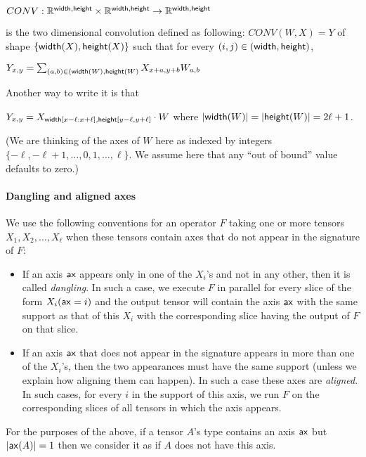 \documentclass{article}
\begin{document}
$CONV: \mathbb{R}^{\mathsf{width},\mathsf{height}} \times \mathbb{R}^{\mathsf{width},\mathsf{height}} \rightarrow \mathbb{R}^{\mathsf{width},\mathsf{height}}$

is the two dimensional convolution defined as following: $CONV(W,X)=Y$ of shape $\{ \mathsf{width}(X),\mathsf{height}(X) \}$ such that for every $(i,j) \in (\mathsf{width},\mathsf{height})$, 

$Y_{x,y} = \sum_{(a,b) \in (\mathsf{width}(W),\mathsf{height}(W)} X_{x+a,y+b} W_{a,b}$

Another way to write it is that 

$Y_{x,y} =  X_{\mathsf{width}[x-\ell:x+\ell],\mathsf{height}[y-\ell,y+\ell]} \cdot W$ where $|\mathsf{width}(W)|=|\mathsf{height}(W)|=2\ell+1$.

(We are thinking of the axes of $W$ here as indexed by integers $\{ -\ell, -\ell+1, \ldots, 0, 1,\ldots, \ell \}$. We assume here that any ``out of bound'' value defaults to zero.)

\paragraph{Dangling and aligned axes} We use the following conventions for an operator $F$ taking one or more tensors $X_1,X_2,\ldots,X_\ell$ when these tensors contain axes that do not appear in the signature of $F$:

\begin{itemize}
  \item If an axis $\mathsf{ax}$ appears only in one of the $X_i$'s and not in any other, then it is called \emph{dangling}. In such a case, we execute $F$ in parallel for every slice of the form $X_i(\mathsf{ax}=i)$ and the output tensor will contain the axis $\mathsf{ax}$ with the same support as that of this $X_i$ with the corresponding slice having the output of $F$ on that slice.

  \item If an axis $\mathsf{ax}$ that does not appear in the signature appears in more than one of the $X_i$'s, then the two appearances must have the same support (unless we explain how aligning them can happen). In such a case these axes are \emph{aligned}. In such cases, for every $i$ in the support of this axis, we run $F$ on the corresponding slices of all tensors in which the axis appears.

\end{itemize}

For the purposes of the above, if a tensor  $A$'s type contains an axis $\mathsf{ax}$ but $|\mathsf{ax}(A)|=1$ then we consider it as if $A$ does not have this axis.
\end{document}
